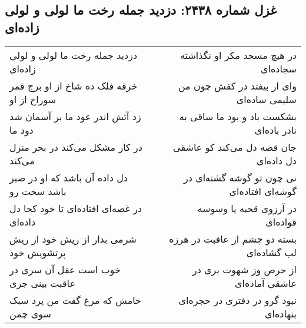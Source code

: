 \begin{center}
\section*{غزل شماره ۲۴۳۸: دزدید جمله رخت ما لولی و لولی زاده‌ای}
\label{sec:2438}
\begin{longtable}{l p{0.5cm} r}
دزدید جمله رخت ما لولی و لولی زاده‌ای
&&
در هیچ مسجد مکر او نگذاشته سجاده‌ای
\\
خرقه فلک ده شاخ از او برج قمر سوراخ از او
&&
وای ار بیفتد در کفش چون من سلیمی ساده‌ای
\\
زد آتش اندر عود ما بر آسمان شد دود ما
&&
بشکست باد و بود ما ساقی به نادر باده‌ای
\\
در کار مشکل می‌کند در بحر منزل می‌کند
&&
جان قصه دل می‌کند کو عاشقی دل داده‌ای
\\
دل داده آن باشد که او در صبر باشد سخت رو
&&
نی چون تو گوشه گشته‌ای در گوشه‌ای افتاده‌ای
\\
در غصه‌ای افتاده‌ای تا خود کجا دل داده‌ای
&&
در آرزوی قحبه یا وسوسه قواده‌ای
\\
شرمی بدار از ریش خود از ریش پرتشویش خود
&&
بسته دو چشم از عاقبت در هرزه لب گشاده‌ای
\\
خوب است عقل آن سری در عاقبت بینی جری
&&
از حرص وز شهوت بری در عاشقی آماده‌ای
\\
خامش که مرغ گفت من پرد سبک سوی چمن
&&
نبود گرو در دفتری در حجره‌ای بنهاده‌ای
\\
\end{longtable}
\end{center}
